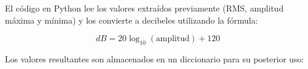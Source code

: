\documentclass[
  letterpaper,
]{scrbook}
\newenvironment{Shaded}{\begin{snugshade}}{\end{snugshade}}
\newcommand{\BuiltInTok}[1]{\textcolor[rgb]{0.00,0.23,0.31}{#1}}
\newcommand{\CommentTok}[1]{\textcolor[rgb]{0.37,0.37,0.37}{#1}}
\newcommand{\DecValTok}[1]{\textcolor[rgb]{0.68,0.00,0.00}{#1}}
\newcommand{\NormalTok}[1]{\textcolor[rgb]{0.00,0.23,0.31}{#1}}
\newcommand{\OperatorTok}[1]{\textcolor[rgb]{0.37,0.37,0.37}{#1}}
\newcommand{\StringTok}[1]{\textcolor[rgb]{0.13,0.47,0.30}{#1}}
\begin{document}
\begin{Shaded}
\end{Shaded}

El código en Python lee los valores extraídos previamente (RMS, amplitud
máxima y mínima) y los convierte a decibeles utilizando la fórmula:

\[dB = 20 \log_{10}(\text{amplitud}) + 120\]

Los valores resultantes son almacenados en un diccionario para su
posterior uso:
\end{document}
